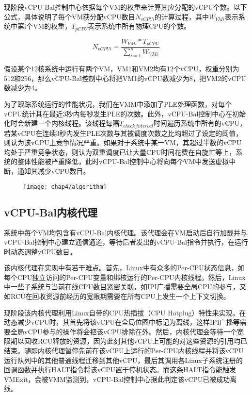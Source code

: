 现阶段vCPU-Bal控制中心依据每个VM的权重来计算其应分配的vCPU个数。以下公式，具体说明了每个VM获分配vCPU数目$N_{vCPUi}$的计算过程，其中$W_{VMi}$表示系统中第i个VM的权重，$T_{pCPU}$表示系统中所有物理CPU的个数。

\begin{equation*}
N_{vCPUi} = \frac{W_{VMi} * T_{pCPU}}{\sum_{i=1}^n W_{VMi}}
\end{equation*}

假设某个12核系统中运行有两个VM，VM1和VM2均有12个vCPU，权重分别为512和256，那么vCPU-Bal控制中心将把VM1的vCPU数减少为8，把VM2的vCPU数减少为4。

为了跟踪系统运行的性能状况，我们在VMM中添加了PLE处理函数，对每个vCPU统计其在最近3秒内每秒发生PLE的次数。此外，vCPU-Bal控制中心在初始化时会新建一个内核线程。该线程每隔$T_{check\_interval}$时间遍历系统中所有的vCPU，若某vCPU在连续3秒内发生PLE次数与其被调度次数之比均超过了设定的阈值，则认为该vCPU上竞争情况严重。如果对于系统中某一VM，其超过半数的vCPU均处于严重竞争状态，则认为双重调度已让大量CPU时间花费在自旋忙等上，系统的整体性能被严重降低，此时vCPU-Bal控制中心将向每个VM中发送虚拟中断，通知其减少vCPU数目。

\begin{figure}[!htbp]
  \centering
  \texttt{[image: chap4/algorithm]}
\end{figure}

\subsection{vCPU-Bal内核代理}

系统中每个VM均包含有vCPU-Bal内核代理。该代理会在VM启动后自行加载并与vCPU-Bal控制中心建立通信通道，等待后者发出的vCPU-Bal指令并执行，在运行时动态调整vCPU数目。

该内核代理在实现中有若干难点。首先，Linux中有众多的Per-CPU状态信息，如每个CPU独立访问的Per-CPU变量和绑核运行的Per-CPU内核线程。然后，Linux中一些子系统与当前在线CPU数目紧密关联，如IPI广播需要全局CPU的参与，又如RCU\cite{mckenney1998read}在回收资源前经历的宽限期需要在所有CPU上发生一个上下文切换。

现阶段该内核代理利用Linux自带的CPU热插拔（CPU Hotplug）特性\cite{mwaikambo2004linux}来实现。在动态减少vCPU时，其首先将该vCPU在全局位图中标记为离线，这样IPI广播等需要全局vCPU参与的操作将会把该vCPU排除在外。然后，内核代理会等待一个宽限期以回收RCU释放的资源，因为此刻其他vCPU上可能的对这些资源的引用均已结束。随即内核代理暂停先前在该vCPU上运行的Per-CPU内核线程并将该vCPU运行队列中的其他普通线程迁移到其他vCPU，最后其调用各Linux子系统注册的回调函数并执行HALT指令将该vCPU置于停机状态。而这条HALT指令能触发VMExit\cite{guide2010intel}，会被VMM监测到，vCPU-Bal控制中心据此判定该vCPU已被成功离线。

